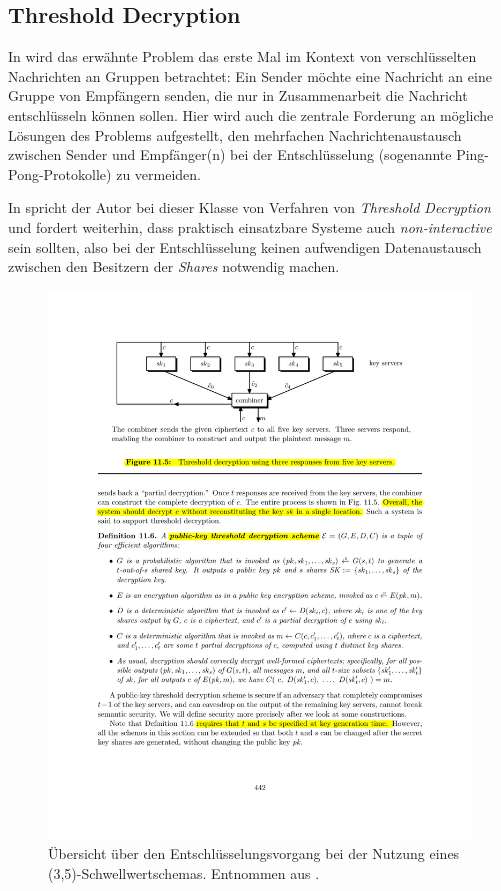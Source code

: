 \subsection{Threshold Decryption}


In \cite{desmedt1987} wird das erwähnte Problem das erste Mal im Kontext von verschlüsselten Nachrichten an Gruppen betrachtet: Ein Sender möchte eine Nachricht an eine Gruppe von Empfängern senden, die nur in Zusammenarbeit die Nachricht entschlüsseln können sollen. Hier wird auch die zentrale Forderung an mögliche Lösungen des Problems aufgestellt, den mehrfachen Nachrichtenaustausch zwischen Sender und Empfänger(n) bei der Entschlüsselung (sogenannte Ping-Pong-Protokolle) zu vermeiden. 

In \cite{desmedt1993} spricht der Autor bei dieser Klasse von Verfahren von \textit{Threshold Decryption} und fordert weiterhin, dass praktisch einsatzbare Systeme auch \textit{non-interactive} sein sollten, also bei der Entschlüsselung keinen aufwendigen Datenaustausch zwischen den Besitzern der \textit{Shares} notwendig machen.

\begin{figure}[]
    \centering
        \includegraphics[clip, trim=3cm 21.2cm 3cm 2cm, width=1.00\textwidth]{img/threshold_decryption_excerpt.pdf}
    \caption{Übersicht über den Entschlüsselungsvorgang bei der Nutzung eines (3,5)-Schwellwertschemas. Entnommen aus \cite{boneh2016}.}
    \label{fig:threshold_decryption_combiner}
\end{figure}

